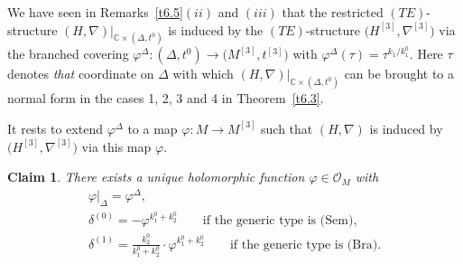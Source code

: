 \documentclass[10pt,a4paper]{amsart}
\numberwithin{equation}{section}
\numberwithin{figure}{section}
\newcommand{\C}{{\mathbb C}}
\newcommand{\OO}{{\mathcal O}}
\newcommand{\nnn}{\nabla}
\newtheorem{claim}[Theorem]{Claim}
 { \theoremstyle{definition}
\newtheorem{Definition}[Theorem]{Definition}
\newtheorem{Remarks}[Theorem]{Remarks}
\newtheorem{Remark}[Theorem]{Remark}
\newtheorem{Notation}[Theorem]{Notation}
\newtheorem{Notations}[Theorem]{Notations} }
\begin{document}
We have seen in Remarks~\ref{t6.5}$(ii)$ and $(iii)$
that the restricted $(TE)$-structure
$(H,\nnn)|_{\C\times(\Delta,t^0)}$
is induced by the $(TE)$-structure $\big(H^{[3]},\nnn^{[3]}\big)$
via the branched covering
$\varphi^\Delta\colon (\Delta,t^0)\to\big(M^{[3]},t^{[3]}\big)$
with $\varphi^\Delta(\tau)= \tau^{k_1/k_1^0}$.
Here $\tau$ denotes {\it that} coordinate on $\Delta$
with which $(H,\nnn)|_{\C\times (\Delta,t^0)}$ can be
brought to a normal form in the cases 1, 2, 3 and 4 in
Theorem~\ref{t6.3}.

It rests to extend $\varphi^\Delta$ to a map
$\varphi\colon M\to M^{[3]}$ such that $(H,\nnn)$ is induced
by $\big(H^{[3]},\nnn^{[3]}\big)$ via this map $\varphi$.

\begin{claim}\label{cl8.9}
There exists a unique holomorphic function
$\varphi\in\OO_M$ with
\begin{gather}\label{8.32}
\varphi|_\Delta= \varphi^\Delta,
\\[.5ex]
\delta^{(0)}= -\varphi^{k_1^0+k_2^0}\qquad
\text{if the generic type is $($Sem$)$},\label{8.33}
\\
\delta^{(1)}= \frac{k_2^0}{k_1^0+k_2^0}\cdot\varphi^{k_1^0+k_2^0}
\qquad\text{if the generic type is $($Bra$)$}.\label{8.34}
\end{gather}
\end{claim}
\end{document}
